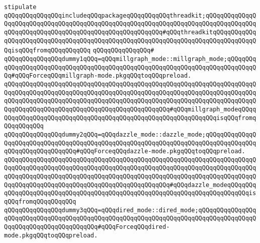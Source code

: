 \newline
\newline
\verb|stipulate|\newline
\verb|qQQqqQQqqQQqqQQqincludeqQQqpackageqQQqqQQqqQQqthreadkit;qQQqqQQqqQQqqQQqqQQqqQQqqQQqqQQqqQQqqQQqqQQqqQQqqQQqqQQqqQQqqQQqqQQqqQQqqQQqqQQqqQQqqQQqqQQqqQQqqQQqqQQqqQQqqQQqqQQqqQQqqQQqqQQq#qQQqthreadkitqQQqqQQqqQQqqQQqqQQqqQQqqQQqqQQqqQQqqQQqqQQqqQQqqQQqqQQqqQQqqQQqqQQqqQQqqQQqqQQqqQQqisqQQqfromqQQqqQQqqQQq|\newline
\verb|qQQqqQQqqQQqqQQq#|\newline
\verb|qQQqqQQqqQQqqQQqdummy1qQQq=qQQqmillgraph_mode::millgraph_mode;qQQqqQQqqQQqqQQqqQQqqQQqqQQqqQQqqQQqqQQqqQQqqQQqqQQqqQQqqQQqqQQqqQQqqQQqqQQqqQQq#qQQqForceqQQqmillgraph-mode.pkgqQQqtoqQQqpreload.|\newline
\verb|qQQqqQQqqQQqqQQqqQQqqQQqqQQqqQQqqQQqqQQqqQQqqQQqqQQqqQQqqQQqqQQqqQQqqQQqqQQqqQQqqQQqqQQqqQQqqQQqqQQqqQQqqQQqqQQqqQQqqQQqqQQqqQQqqQQqqQQqqQQqqQQqqQQqqQQqqQQqqQQqqQQqqQQqqQQqqQQqqQQqqQQqqQQqqQQqqQQqqQQqqQQqqQQqqQQqqQQqqQQqqQQqqQQqqQQqqQQqqQQqqQQqqQQqqQQqqQQq#qQQqmillgraph_modeqQQqqQQqqQQqqQQqqQQqqQQqqQQqqQQqqQQqqQQqqQQqqQQqqQQqqQQqqQQqqQQqisqQQqfromqQQqqQQqqQQq|\newline
\newline
\verb|qQQqqQQqqQQqqQQqdummy2qQQq=qQQqdazzle_mode::dazzle_mode;qQQqqQQqqQQqqQQqqQQqqQQqqQQqqQQqqQQqqQQqqQQqqQQqqQQqqQQqqQQqqQQqqQQqqQQqqQQqqQQqqQQqqQQqqQQqqQQqqQQqqQQq#qQQqForceqQQqdazzle-mode.pkgqQQqtoqQQqpreload.|\newline
\verb|qQQqqQQqqQQqqQQqqQQqqQQqqQQqqQQqqQQqqQQqqQQqqQQqqQQqqQQqqQQqqQQqqQQqqQQqqQQqqQQqqQQqqQQqqQQqqQQqqQQqqQQqqQQqqQQqqQQqqQQqqQQqqQQqqQQqqQQqqQQqqQQqqQQqqQQqqQQqqQQqqQQqqQQqqQQqqQQqqQQqqQQqqQQqqQQqqQQqqQQqqQQqqQQqqQQqqQQqqQQqqQQqqQQqqQQqqQQqqQQqqQQqqQQqqQQqqQQq#qQQqdazzle_modeqQQqqQQqqQQqqQQqqQQqqQQqqQQqqQQqqQQqqQQqqQQqqQQqqQQqqQQqqQQqqQQqqQQqqQQqqQQqisqQQqfromqQQqqQQqqQQq|\newline
\newline
\verb|qQQqqQQqqQQqqQQqdummy3qQQq=qQQqdired_mode::dired_mode;qQQqqQQqqQQqqQQqqQQqqQQqqQQqqQQqqQQqqQQqqQQqqQQqqQQqqQQqqQQqqQQqqQQqqQQqqQQqqQQqqQQqqQQqqQQqqQQqqQQqqQQqqQQqqQQq#qQQqForceqQQqdired-mode.pkgqQQqtoqQQqpreload.|\newline
